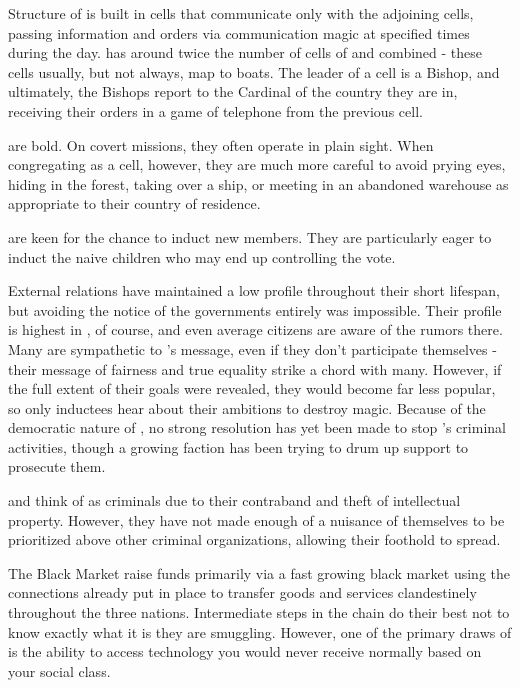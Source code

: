 \documentclass[blue]{GL2020}
\begin{document}
Structure of \pCult
\pCult is built in cells that communicate only with the adjoining cells, passing information and orders via communication magic at specified times during the day. \pViking has around twice the number of cells of \pTech and \pFarm combined - these cells usually, but not always, map to boats. The leader of a cell is a Bishop, and ultimately, the Bishops report to the Cardinal of the country they are in, receiving their orders in a game of telephone from the previous cell.

\pCult are bold. On covert missions, they often operate in plain sight. When congregating as a cell, however, they are much more careful to avoid prying eyes, hiding in the forest, taking over a ship, or meeting in an abandoned warehouse as appropriate to their country of residence.

\pCult are keen for the chance to induct new members. They are particularly eager to induct the naive children who may end up controlling the vote.

External relations
\pCult have maintained a low profile throughout their short lifespan, but avoiding the notice of the governments entirely was impossible. Their profile is highest in \pViking, of course, and even average citizens are aware of the rumors there. Many \pViking{\people} are sympathetic to \cCult's message, even if they don’t participate themselves - their message of fairness and true equality strike a chord with many. However, if the full extent of their goals were revealed, they would become far less popular, so only inductees hear about their ambitions to destroy magic. Because of the democratic nature of \pViking, no strong resolution has yet been made to stop \pCult's criminal activities, though a growing faction has been trying to drum up support to prosecute them.

\pTech and \pFarm think of \pCult as criminals due to their contraband and theft of intellectual property. However, they have not made enough of a nuisance of themselves to be prioritized above other criminal organizations, allowing their foothold to spread.

The Black Market
\pCult raise funds primarily via a fast growing black market using the connections already put in place to transfer goods and services clandestinely throughout the three nations. Intermediate steps in the chain do their best not to know exactly what it is they are smuggling. However, one of the primary draws of \pCult{} is the ability to access technology you would never receive normally based on your social class. 
\end{document}
